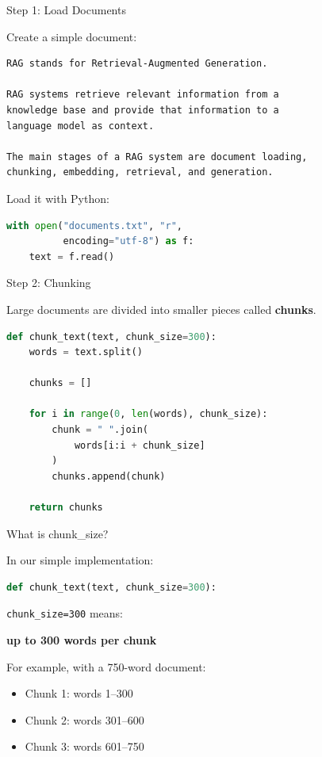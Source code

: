 \documentclass[aspectratio=169]{beamer}
\begin{document}
\begin{frame}[fragile]{Step 1: Load Documents}

Create a simple document:

\begin{lstlisting}[language={},caption={documents.txt}]
RAG stands for Retrieval-Augmented Generation.

RAG systems retrieve relevant information from a
knowledge base and provide that information to a
language model as context.

The main stages of a RAG system are document loading,
chunking, embedding, retrieval, and generation.
\end{lstlisting}

Load it with Python:

\begin{lstlisting}[language=Python]
with open("documents.txt", "r",
          encoding="utf-8") as f:
    text = f.read()
\end{lstlisting}

\end{frame}

\begin{frame}[fragile]{Step 2: Chunking}

Large documents are divided into smaller pieces called
\textbf{chunks}.

\begin{lstlisting}[language=Python]
def chunk_text(text, chunk_size=300):
    words = text.split()

    chunks = []

    for i in range(0, len(words), chunk_size):
        chunk = " ".join(
            words[i:i + chunk_size]
        )
        chunks.append(chunk)

    return chunks
\end{lstlisting}

\end{frame}

\begin{frame}[fragile]{What is chunk\_size?}

In our simple implementation:

\begin{lstlisting}[language=Python]
def chunk_text(text, chunk_size=300):
\end{lstlisting}

\texttt{chunk\_size=300} means:

\begin{center}
\Large
\textbf{up to 300 words per chunk}
\end{center}

For example, with a 750-word document:

\begin{itemize}
    \item Chunk 1: words 1--300
    \item Chunk 2: words 301--600
    \item Chunk 3: words 601--750
\end{itemize}

\end{frame}
\end{document}
